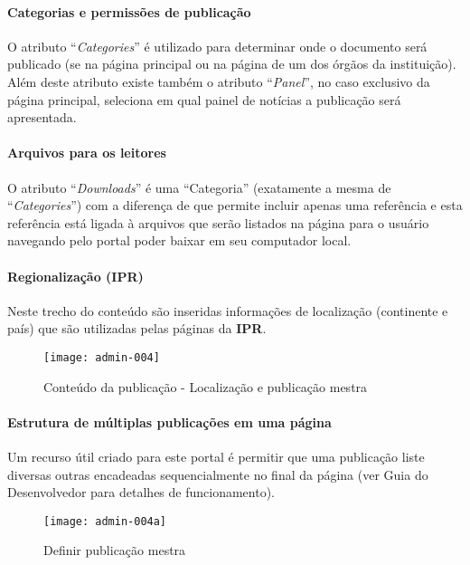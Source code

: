\paragraph{Categorias e permissões de publicação}

O atributo ``\textit{Categories}'' é utilizado para determinar onde o documento será publicado (se na página principal ou na página de um dos órgãos da instituição). Além deste atributo existe também o atributo ``\textit{Panel}'', no caso exclusivo da página principal, seleciona em qual painel de notícias a publicação será apresentada.

\paragraph{Arquivos para os leitores}

O atributo ``\textit{Downloads}'' é uma ``Categoria'' (exatamente a mesma de ``\textit{Categories}'') com a diferença de que permite incluir apenas uma referência e esta referência está ligada à arquivos que serão listados na página para o usuário navegando pelo portal poder baixar em seu computador local.

\paragraph{Regionalização (IPR)}

Neste trecho do conteúdo são inseridas informações de localização (continente e país) que são utilizadas pelas páginas da \textbf{IPR}.

\begin{figure}[!ht]
    \centering
    \texttt{[image: admin-004]}
    \caption{Conteúdo da publicação - Localização e publicação mestra}\label{RS0006:fig:admin-004}
\end{figure}

\paragraph{Estrutura de múltiplas publicações em uma página}

Um recurso útil criado para este portal é permitir que uma publicação liste diversas outras encadeadas sequencialmente no final da página (ver Guia do Desenvolvedor para detalhes de funcionamento).

\begin{figure}[!ht]
    \centering
    \texttt{[image: admin-004a]}
    \caption{Definir publicação mestra}\label{RS0006:fig:admin-004a}
\end{figure}

